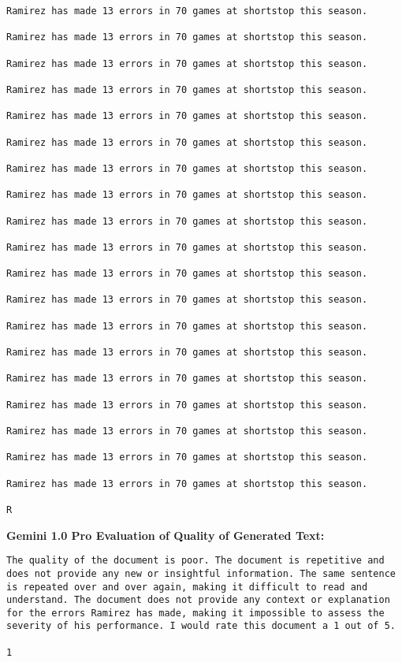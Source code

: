 \begin{lstlisting}
Ramirez has made 13 errors in 70 games at shortstop this season.

Ramirez has made 13 errors in 70 games at shortstop this season.

Ramirez has made 13 errors in 70 games at shortstop this season.

Ramirez has made 13 errors in 70 games at shortstop this season.

Ramirez has made 13 errors in 70 games at shortstop this season.

Ramirez has made 13 errors in 70 games at shortstop this season.

Ramirez has made 13 errors in 70 games at shortstop this season.

Ramirez has made 13 errors in 70 games at shortstop this season.

Ramirez has made 13 errors in 70 games at shortstop this season.

Ramirez has made 13 errors in 70 games at shortstop this season.

Ramirez has made 13 errors in 70 games at shortstop this season.

Ramirez has made 13 errors in 70 games at shortstop this season.

Ramirez has made 13 errors in 70 games at shortstop this season.

Ramirez has made 13 errors in 70 games at shortstop this season.

Ramirez has made 13 errors in 70 games at shortstop this season.

Ramirez has made 13 errors in 70 games at shortstop this season.

Ramirez has made 13 errors in 70 games at shortstop this season.

Ramirez has made 13 errors in 70 games at shortstop this season.

Ramirez has made 13 errors in 70 games at shortstop this season.

R
\end{lstlisting}

{\bf\ttfamily Gemini 1.0 Pro Evaluation of Quality of Generated Text:}
\begin{lstlisting}
The quality of the document is poor. The document is repetitive and does not provide any new or insightful information. The same sentence is repeated over and over again, making it difficult to read and understand. The document does not provide any context or explanation for the errors Ramirez has made, making it impossible to assess the severity of his performance. I would rate this document a 1 out of 5.

1
\end{lstlisting}

